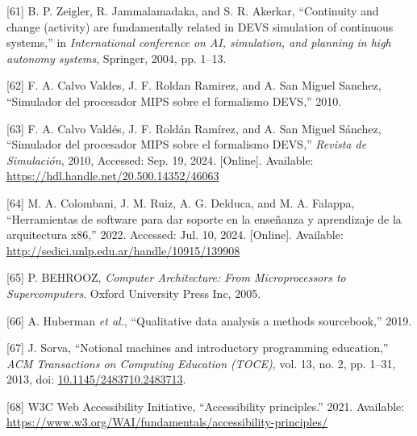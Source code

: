 \documentclass[12pt,oneside]{templates/unerthesis}
\newcommand{\CSLLeftMargin}[1]{#1} %
\newcommand{\CSLRightInline}[1]{#1} %
\newlength{\cslhangindent}
\newenvironment{CSLReferences}[2] %
 {\setlength{\parindent}{0pt}%
  \setlength{\leftskip}{#1 pt\relax}%
  \setlength{\parskip}{#2 pt\relax}%
  \everypar{\setlength{\hangindent}{\cslhangindent}}}
 {\par}
\begin{document}
\begin{CSLReferences}{0}{0}
\leavevmode{}%
\CSLLeftMargin{{[}61{]} }%
\CSLRightInline{B. P. Zeigler, R. Jammalamadaka, and S. R. Akerkar, {``Continuity and change (activity) are fundamentally related in DEVS simulation of continuous systems,''} in \emph{International conference on AI, simulation, and planning in high autonomy systems}, Springer, 2004, pp. 1--13.}

\leavevmode{}%
\CSLLeftMargin{{[}62{]} }%
\CSLRightInline{F. A. Calvo Valdes, J. F. Roldan Ramirez, and A. San Miguel Sanchez, {``Simulador del procesador MIPS sobre el formalismo DEVS,''} 2010.}

\leavevmode{}%
\CSLLeftMargin{{[}63{]} }%
\CSLRightInline{F. A. Calvo Valdés, J. F. Roldán Ramírez, and A. San Miguel Sánchez, {``Simulador del procesador {MIPS} sobre el formalismo {DEVS},''} \emph{Revista de Simulación}, 2010, Accessed: Sep. 19, 2024. {[}Online{]}. Available: \url{https://hdl.handle.net/20.500.14352/46063}}

\leavevmode{}%
\CSLLeftMargin{{[}64{]} }%
\CSLRightInline{M. A. Colombani, J. M. Ruiz, A. G. Delduca, and M. A. Falappa, {``Herramientas de software para dar soporte en la enseñanza y aprendizaje de la arquitectura x86,''} 2022. Accessed: Jul. 10, 2024. {[}Online{]}. Available: \url{http://sedici.unlp.edu.ar/handle/10915/139908}}

\leavevmode{}%
\CSLLeftMargin{{[}65{]} }%
\CSLRightInline{P. BEHROOZ, \emph{Computer {Architecture}: {From} {Microprocessors} to {Supercomputers}}. Oxford University Press Inc, 2005.}

\leavevmode{}%
\CSLLeftMargin{{[}66{]} }%
\CSLRightInline{A. Huberman \emph{et al.}, {``Qualitative data analysis a methods sourcebook,''} 2019.}

\leavevmode{}%
\CSLLeftMargin{{[}67{]} }%
\CSLRightInline{J. Sorva, {``Notional machines and introductory programming education,''} \emph{ACM Transactions on Computing Education (TOCE)}, vol. 13, no. 2, pp. 1--31, 2013, doi: \href{https://doi.org/10.1145/2483710.2483713}{10.1145/2483710.2483713}.}

\leavevmode{}%
\CSLLeftMargin{{[}68{]} }%
\CSLRightInline{W3C Web Accessibility Initiative, {``Accessibility principles.''} 2021. Available: \url{https://www.w3.org/WAI/fundamentals/accessibility-principles/}}


\end{CSLReferences}
\end{document}
